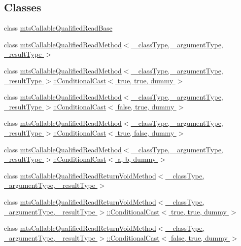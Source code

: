\subsection*{Classes}
\begin{DoxyCompactItemize}
\item 
class \hyperlink{classmts_callable_qualified_read_base}{mts\+Callable\+Qualified\+Read\+Base}
\item 
class \hyperlink{classmts_callable_qualified_read_method}{mts\+Callable\+Qualified\+Read\+Method$<$ \+\_\+class\+Type, \+\_\+argument\+Type, \+\_\+result\+Type $>$}
\item 
class \hyperlink{classmts_callable_qualified_read_method_1_1_conditional_cast_3_01true_00_01true_00_01dummy_01_4}{mts\+Callable\+Qualified\+Read\+Method$<$ \+\_\+class\+Type, \+\_\+argument\+Type, \+\_\+result\+Type $>$\+::\+Conditional\+Cast$<$ true, true, dummy $>$}
\item 
class \hyperlink{classmts_callable_qualified_read_method_1_1_conditional_cast_3_01false_00_01true_00_01dummy_01_4}{mts\+Callable\+Qualified\+Read\+Method$<$ \+\_\+class\+Type, \+\_\+argument\+Type, \+\_\+result\+Type $>$\+::\+Conditional\+Cast$<$ false, true, dummy $>$}
\item 
class \hyperlink{classmts_callable_qualified_read_method_1_1_conditional_cast_3_01true_00_01false_00_01dummy_01_4}{mts\+Callable\+Qualified\+Read\+Method$<$ \+\_\+class\+Type, \+\_\+argument\+Type, \+\_\+result\+Type $>$\+::\+Conditional\+Cast$<$ true, false, dummy $>$}
\item 
class \hyperlink{classmts_callable_qualified_read_method_1_1_conditional_cast}{mts\+Callable\+Qualified\+Read\+Method$<$ \+\_\+class\+Type, \+\_\+argument\+Type, \+\_\+result\+Type $>$\+::\+Conditional\+Cast$<$ a, b, dummy $>$}
\item 
class \hyperlink{classmts_callable_qualified_read_return_void_method}{mts\+Callable\+Qualified\+Read\+Return\+Void\+Method$<$ \+\_\+class\+Type, \+\_\+argument\+Type, \+\_\+result\+Type $>$}
\item 
class \hyperlink{classmts_callable_qualified_read_return_void_method_1_1_conditional_cast_3_01true_00_01true_00_01dummy_01_4}{mts\+Callable\+Qualified\+Read\+Return\+Void\+Method$<$ \+\_\+class\+Type, \+\_\+argument\+Type, \+\_\+result\+Type $>$\+::\+Conditional\+Cast$<$ true, true, dummy $>$}
\item 
class \hyperlink{classmts_callable_qualified_read_return_void_method_1_1_conditional_cast_3_01false_00_01true_00_01dummy_01_4}{mts\+Callable\+Qualified\+Read\+Return\+Void\+Method$<$ \+\_\+class\+Type, \+\_\+argument\+Type, \+\_\+result\+Type $>$\+::\+Conditional\+Cast$<$ false, true, dummy $>$}

\end{DoxyCompactItemize}
